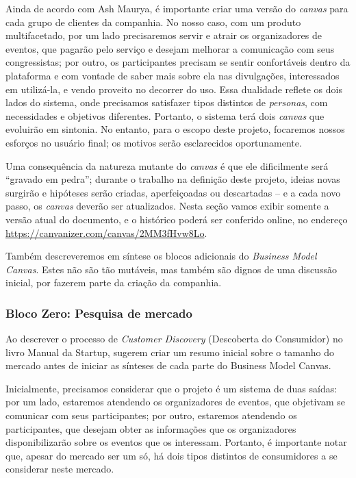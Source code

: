 \documentclass[12pt,a4paper,twoside,hyphens,english,brazil]{abntex2}
\begin{document}
Ainda de acordo com Ash Maurya\cite{lean-canvas}, é importante criar uma versão do \emph{canvas} para cada grupo de clientes da companhia. No nosso caso, com um produto multifacetado, por um lado precisaremos servir e atrair os organizadores de eventos, que pagarão pelo serviço e desejam melhorar a comunicação com seus congressistas; por outro, os participantes precisam se sentir confortáveis dentro da plataforma e com vontade de saber mais sobre ela nas divulgações, interessados em utilizá-la, e vendo proveito no decorrer do uso. Essa dualidade reflete os dois lados do sistema, onde precisamos satisfazer tipos distintos de \emph{personas}\footnotemark, com necessidades e objetivos diferentes. Portanto, o sistema terá dois \emph{canvas} que evoluirão em sintonia. No entanto, para o escopo deste projeto, focaremos nossos esforços no usuário final; os motivos serão esclarecidos oportunamente.

Uma consequência da natureza mutante do \emph{canvas} é que ele dificilmente será ``gravado em pedra''; durante o trabalho na definição deste projeto, ideias novas surgirão e hipóteses serão criadas, aperfeiçoadas ou descartadas -- e a cada novo passo, os \emph{canvas} deverão ser atualizados. Nesta seção vamos exibir somente a versão atual do documento, e o histórico poderá ser conferido online, no endereço \mbox{\url{https://canvanizer.com/canvas/2MM3fHvw8Lo}}.

Também descreveremos em síntese os blocos adicionais do \emph{Business Model Canvas}. Estes não são tão mutáveis, mas também são dignos de uma discussão inicial, por fazerem parte da criação da companhia.

\subsubsection*{Bloco Zero: Pesquisa de mercado}
\label{sec:lean:mercado}
Ao descrever o processo de \textit{Customer Discovery} (Descoberta do Consumidor) no livro Manual da Startup\cite{manual-startup},  sugerem criar um resumo inicial sobre o tamanho do mercado antes de iniciar as sínteses de cada parte do Business Model Canvas.

Inicialmente, precisamos considerar que o projeto é um sistema de duas saídas: por um lado, estaremos atendendo os organizadores de eventos, que objetivam se comunicar com seus participantes; por outro, estaremos atendendo os participantes, que desejam obter as informações que os organizadores disponibilizarão sobre os eventos que os interessam. Portanto, é importante notar que, apesar do mercado ser um só, há dois tipos distintos de consumidores a se considerar neste mercado.
\end{document}

